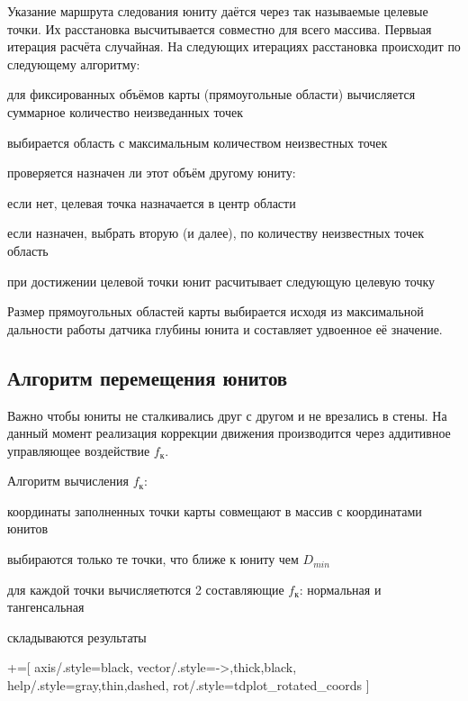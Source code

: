 Указание маршрута следования юниту даётся через так называемые целевые точки.
Их расстановка высчитывается совместно для всего массива. Первыая итерация расчёта
случайная. На следующих итерациях расстановка происходит по следующему алгоритму:
\begin{mintemize}
\item для фиксированных объёмов карты (прямоугольные области) вычисляется суммарное
    количество неизведанных точек
\item выбирается область с максимальным количеством неизвестных точек
\item проверяется назначен ли этот объём другому юниту:
    \begin{mintemize}
        \item если нет, целевая точка назначается в центр области
        \item если назначен, выбрать вторую (и далее), по количеству неизвестных точек область
    \end{mintemize}
\item при достижении целевой точки юнит расчитывает следующую целевую точку
\end{mintemize}

Размер прямоугольных областей карты выбирается исходя из максимальной дальности работы
датчика глубины юнита и составляет удвоенное её значение.

\newpage
\subsection{Алгоритм перемещения юнитов}

Важно чтобы юниты не сталкивались друг с другом и не врезались в стены.
На данный момент реализация коррекции движения производится через аддитивное управляющее
воздействие $f_{\text{к}}$. 

Алгоритм вычисления $f_{\text{к}}$:
\begin{mintemize}
\item координаты заполненных точки карты совмещают в массив с координатами юнитов
\item выбираются только те точки, что ближе к юниту чем $D_{min}$
\item для каждой точки вычисляетются 2 составляющие $f_{\text{к}}$: нормальная и тангенсальная
\item складываются результаты
\end{mintemize}

+=[
    axis/.style={black},
    vector/.style={->,thick,black},
    help/.style={gray,thin,dashed},
    rot/.style={tdplot_rotated_coords}
]

